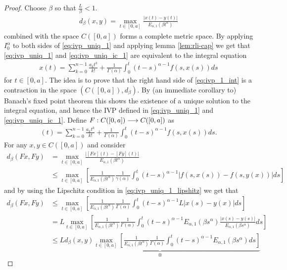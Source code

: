 \begin{proof}
	Choose $ \beta $ so that $ \frac{L}{\beta} < 1 $.
	\begin{align*}
		d_\beta(x,y) = \max_{t \in [0,a]} \frac{|x(t) - y(t)|}{E_{\alpha,1}(\beta t^\alpha)}
	\end{align*}
	combined with the space $ C([0,a]) $ forms a complete metric space. By applying $ I_0^\alpha $ to both sides of \eqref{eq:ivp_uniq_1} and applying lemma \ref{lem:rli-cap} we get that \eqref{eq:ivp_uniq_1} and \eqref{eq:ivp_uniq_ic_1} are equivalent to the integral equation
	\begin{align}
		\label{eq:ivp_1_int}
		x(t) = \sum_{k=0}^{n-1} \frac{a_k t^k}{k!} + \frac{1}{\Gamma(\alpha)} \int_0^t (t-s)^{\alpha-1}f(s,x(s))ds
	\end{align}
	for $ t \in [0,a] $.
	The idea is to prove that the right hand side of \eqref{eq:ivp_1_int} is a contraction in the space $ (C([0,a]),d_\beta) $. By (an immediate corollary to) Banach's fixed point theorem this shows the existence of a unique solution to the integral equation, and hence the IVP defined in \eqref{eq:ivp_uniq_1} and \eqref{eq:ivp_uniq_ic_1}.
	Define $ F : C([0,a]) \longrightarrow C([0,a]) $
	as
	\begin{align*}
		[Fx](t) = \sum_{k=0}^{n-1} \frac{a_k t^k}{k!}  + \frac{1}{\Gamma(\alpha)} \int_0^t (t-s)^{\alpha-1}f(s,x(s))ds.
	\end{align*}
	For any $ x, y \in C([0,a]) $ and consider
	\begin{align*}
		d_\beta(Fx,Fy) &= \max_{t\in[0,a]} \frac{|[Fx](t) - [Fy](t)|}{E_{\alpha,1}(\beta t^\alpha)} \\
			&\leq \max_{t\in[0,a]} \left[ \frac{1}{E_{\alpha,1}(\beta t^\alpha)} \frac{1}{\gamma(\alpha)} \int_0^t (t-s)^{\alpha-1}| f(s,x(s)) - f(s,y(x))|ds  \right]
	\end{align*}
	and by using the Lipschitz condition in \eqref{eq:ivp_uniq_1_lipshitz} we get that
	\begin{align*}
		d_\beta(Fx,Fy) &\leq \max_{t\in[0,a]} \left[ \frac{1}{E_{\alpha,1}(\beta t^\alpha)} \frac{1}{\Gamma(\alpha)} \int_0^t (t-s)^{\alpha-1}L| x(s) - y(x)|ds  \right] \\
		&= L  \max_{t\in[0,a]} \left[ \frac{1}{E_{\alpha,1}(\beta t^\alpha)} \frac{1}{\Gamma(\alpha)} \int_0^t (t-s)^{\alpha - 1} E_{\alpha,1}(\beta s^\alpha) \frac{|x(s) - y(s)|}{E_{\alpha,1}(\beta s^\alpha)} ds \right] \\
		&\leq \underbrace{L d_\beta(x,y) \max_{t\in [0,a]} \left[ \frac{1}{E_{\alpha,1}(\beta t^\alpha)}\frac{1}{\Gamma(\alpha)} \int_0^t (t-s)^{\alpha-1} E_{\alpha,1}(\beta s^\alpha) ds\right]}_{\circledast}

\end{align*}
\end{proof}
